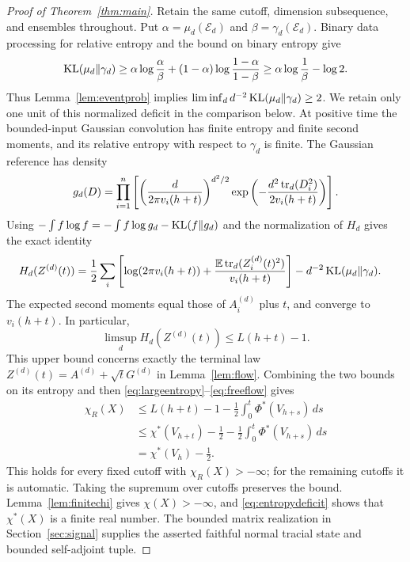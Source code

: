 \begin{proof}[Proof of Theorem~\ref{thm:main}]
Retain the same cutoff, dimension subsequence, and ensembles throughout.
Put $\alpha=\mu_d(\mathcal E_d)$ and
$\beta=\gamma_d(\mathcal E_d)$. Binary data processing for relative
entropy and the bound on binary entropy give
\[
 \operatorname{KL}(\mu_d\Vert\gamma_d)
 \geq\alpha\log\frac\alpha\beta
 +(1-\alpha)\log\frac{1-\alpha}{1-\beta}
 \geq\alpha\log\frac1\beta-\log2.
\]
Thus Lemma~\ref{lem:eventprob} implies
$\liminf_d d^{-2}\operatorname{KL}(\mu_d\Vert\gamma_d)\geq2$.
We retain only one unit of this normalized deficit in the comparison below.
At positive time the bounded-input Gaussian convolution has finite
entropy and finite second moments, and its relative entropy with respect
to $\gamma_d$ is finite. The Gaussian reference has density
\[
 g_d(D)=\prod_{i=1}^n
 \left[
 \left(\frac{d}{2\pi v_i(h+t)}\right)^{d^2/2}
 \exp\left(-\frac{d^2\operatorname{tr}_d(D_i^2)}{2v_i(h+t)}\right)
 \right].
\]
Using $-\int f\log f=-\int f\log g_d-\operatorname{KL}(f\Vert g_d)$ and the
normalization of $H_d$ gives the exact identity
\begin{align*}
 H_d(Z^{(d)}(t))
 &=\frac12\sum_i\left[
 \log(2\pi v_i(h+t))+
 \frac{\mathbb E\operatorname{tr}_d(Z_i^{(d)}(t)^2)}{v_i(h+t)}\right]
 -d^{-2}\operatorname{KL}(\mu_d\Vert\gamma_d).
\end{align*}
The expected second moments equal those of $A_i^{(d)}$ plus $t$, and
converge to $v_i(h+t)$. In particular,
\[
 \limsup_d H_d(Z^{(d)}(t))\leq L(h+t)-1.
\]
This upper bound concerns exactly the terminal law
$Z^{(d)}(t)=A^{(d)}+\sqrt t G^{(d)}$ in Lemma~\ref{lem:flow}.
Combining the two bounds on its entropy and then
\eqref{eq:largeentropy}--\eqref{eq:freeflow} gives
\begin{align*}
 \chi_R(X)
 &\leq L(h+t)-1-\frac12\int_0^t\Phi^*(V_{h+s})\,ds\\
 &\leq\chi^*(V_{h+t})-\tfrac12
       -\frac12\int_0^t\Phi^*(V_{h+s})\,ds\\
 &=\chi^*(V_h)-\tfrac12.
\end{align*}
This holds for every fixed cutoff with $\chi_R(X)>-\infty$; for the
remaining cutoffs it is automatic. Taking the supremum over cutoffs
preserves the bound. Lemma~\ref{lem:finitechi} gives $\chi(X)>-\infty$,
and \eqref{eq:entropydeficit} shows that $\chi^*(X)$ is a finite real number.
The bounded matrix realization in Section~\ref{sec:signal} supplies
the asserted faithful normal tracial state and bounded self-adjoint tuple.
\end{proof}

